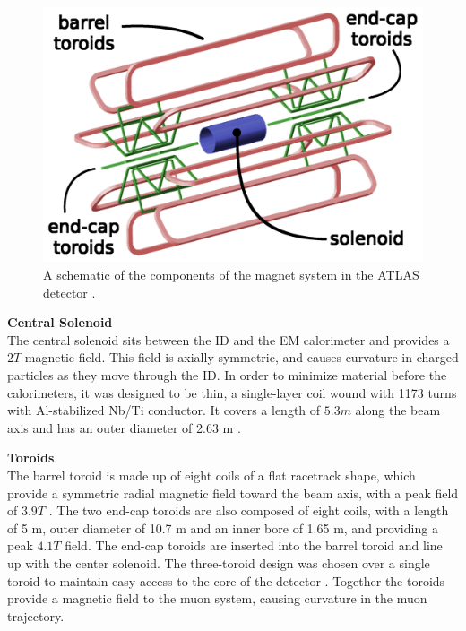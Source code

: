 \begin{figure}[!ht]
    \centering
    \includegraphics[width=.8\textwidth]{chapters/chapter2_experiment/images/magnetSystems.png}
    \caption[A schematic of the components of the magnet system in the ATLAS detector]{A schematic of the components of the magnet system in the ATLAS detector \cite{magnet-schematic}.}
    \label{fig:magnetSystem}
\end{figure}

\noindent\textbf{Central Solenoid}\\
\indent The central solenoid sits between the \gls{ID} and the \gls{EM} calorimeter and provides a $\unit{2}{T}$ magnetic field. This field is axially symmetric, and causes curvature in charged particles as they move through the \gls{ID}. In order to minimize material before the calorimeters, it was designed to be thin, a single-layer coil wound with 1173 turns with Al-stabilized Nb/Ti conductor. It covers a length of $\unit{5.3}{m}$ along the beam axis and has an outer diameter of 2.63 m \cite{central-solenoid}.

\noindent\textbf{Toroids}\\
\indent The barrel toroid is made up of eight coils of a flat racetrack shape, which provide a symmetric radial magnetic field toward the beam axis, with a peak field of $\unit{3.9}{T}$ \cite{barrel-toroid}. The two end-cap toroids are also composed of eight coils, with a length of 5 m, outer diameter of 10.7 m and an inner bore of 1.65 m, and providing a peak $\unit{4.1}{T}$ field. The end-cap toroids are inserted into the barrel toroid and line up with the center solenoid. The three-toroid design was chosen over a single toroid to maintain easy access to the core of the detector \cite{endcap-toroid}. Together the toroids provide a magnetic field to the muon system, causing curvature in the muon trajectory.


